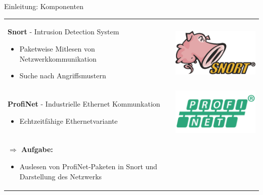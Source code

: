 \begin{frame}{Einleitung: Komponenten}
\begin{tabular}{m{8cm}r}
  \textbf{Snort} - Intrusion Detection System
    \begin{itemize}
      \item Paketweise Mitlesen von Netzwerkkommunikation
      \item Suche nach Angriffsmustern
    \end{itemize} & \includegraphics[width=0.2\linewidth]{images/max-snort} \\
  \pause
  \textbf{ProfiNet} - Industrielle Ethernet Kommunkation
    \begin{itemize}
      \item Echtzeitfähige Ethernetvariante
    \end{itemize} & \includegraphics[width=0.2\linewidth]{images/max-profinet} \\
  \pause
  \textbf{$\Rightarrow$ Aufgabe:}
  \begin{itemize}
    \item Auslesen von ProfiNet-Paketen in Snort und Darstellung des Netzwerks
  \end{itemize}
\end{tabular}
\end{frame}

